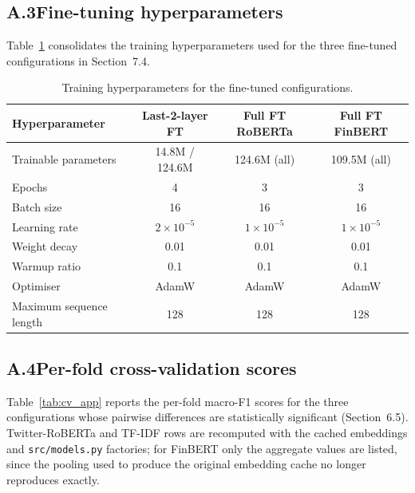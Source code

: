 \documentclass[12pt,a4paper]{article}
\begin{document}
\subsection*{A.3\quad Fine-tuning hyperparameters}
Table~\ref{tab:hyperparams_app} consolidates the training hyperparameters used for the three fine-tuned configurations in Section~7.4.

\begin{table}[!htbp]
\centering
\small
\setlength{\tabcolsep}{4pt}
\begin{tabular}{lccc}
\toprule
\textbf{Hyperparameter} & \textbf{Last-2-layer FT} & \textbf{Full FT RoBERTa} & \textbf{Full FT FinBERT} \\
\midrule
Trainable parameters       & 14.8M / 124.6M    & 124.6M (all)      & 109.5M (all) \\
Epochs                     & 4                 & 3                 & 3 \\
Batch size                 & 16                & 16                & 16 \\
Learning rate              & $2\!\times\!10^{-5}$ & $1\!\times\!10^{-5}$ & $1\!\times\!10^{-5}$ \\
Weight decay               & 0.01              & 0.01              & 0.01 \\
Warmup ratio               & 0.1               & 0.1               & 0.1 \\
Optimiser                  & AdamW             & AdamW             & AdamW \\
Maximum sequence length    & 128               & 128               & 128 \\
\bottomrule
\end{tabular}
\caption{Training hyperparameters for the fine-tuned configurations.}
\label{tab:hyperparams_app}
\end{table}

\subsection*{A.4\quad Per-fold cross-validation scores}
Table~\ref{tab:cv_app} reports the per-fold macro-F1 scores for the three configurations whose pairwise differences are statistically significant (Section~6.5). Twitter-RoBERTa and TF-IDF rows are recomputed with the cached embeddings and \texttt{src/models.py} factories; for FinBERT only the aggregate values are listed, since the pooling used to produce the original embedding cache no longer reproduces exactly.
\end{document}
